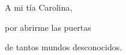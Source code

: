 
\begin{dedication}
A mi tía Carolina,

por abrirme las puertas

de tantos mundos desconocidos.
\end{dedication}